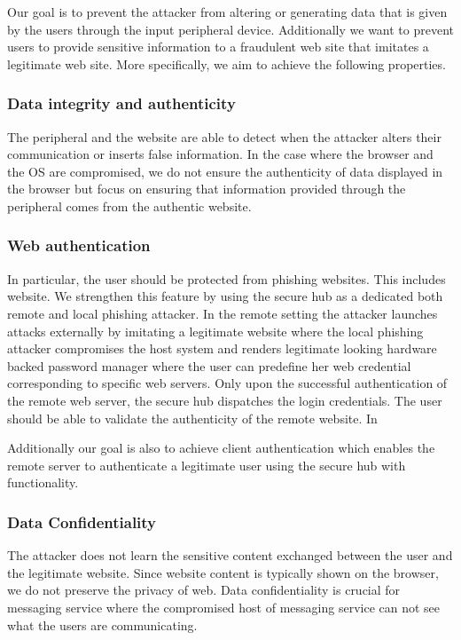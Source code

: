 Our goal is to prevent the attacker from altering or generating data that is given by the users through the input peripheral device. Additionally we want to prevent users to provide sensitive information to a fraudulent web site that imitates a legitimate web site. More specifically, we aim to achieve the following properties.

\subsubsection{Data integrity and authenticity}

The peripheral and the website are able to detect when the attacker alters their communication or inserts false information. In the case where the browser and the OS are compromised, we do not ensure the authenticity of data displayed in the browser but focus on ensuring that information provided through the peripheral comes from the authentic website.


\subsubsection{Web authentication}

In particular, the user should be protected from phishing websites. This includes website. We strengthen this feature by using the secure hub as a dedicated both remote and local phishing attacker. In the remote setting the attacker launches attacks externally by imitating a legitimate website where the local phishing attacker compromises the host system and renders legitimate looking hardware backed password manager where the user can predefine her web credential corresponding to specific web servers. Only upon the successful authentication of the remote web server, the secure hub dispatches the login credentials. The user should be able to validate the authenticity of the remote website. In
 
Additionally our goal is also to achieve client authentication which enables the remote server to authenticate a legitimate user using the secure hub with \webusb functionality.

\subsubsection{Data Confidentiality}

The attacker does not learn the sensitive content exchanged between the user and the legitimate website. Since website content is typically shown on the browser, we do not preserve the privacy of web. Data confidentiality is crucial for messaging service where the compromised host of messaging service can not see what the users are communicating.
